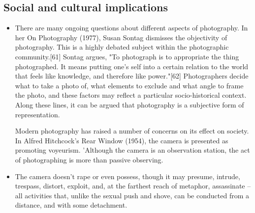 \documentclass{article}
\begin{document}
\newpage
\subsection{Social and cultural implications}

\begin{itemize}
\item There are many ongoing questions about different aspects of photography. In her On Photography (1977), Susan Sontag dismisses the objectivity of photography. This is a highly debated subject within the photographic community.[61] Sontag argues, "To photograph is to appropriate the thing photographed. It means putting one's self into a certain relation to the world that feels like knowledge, and therefore like power."[62] Photographers decide what to take a photo of, what elements to exclude and what angle to frame the photo, and these factors may reflect a particular socio-historical context. Along these lines, it can be argued that photography is a subjective form of representation.

Modern photography has raised a number of concerns on its effect on society. In Alfred Hitchcock's Rear Window (1954), the camera is presented as promoting voyeurism. 'Although the camera is an observation station, the act of photographing is more than passive observing.
\item The camera doesn't rape or even possess, though it may presume, intrude, trespass, distort, exploit, and, at the farthest reach of metaphor, assassinate – all activities that, unlike the sexual push and shove, can be conducted from a distance, and with some detachment.
\end{itemize}
\end{document}
